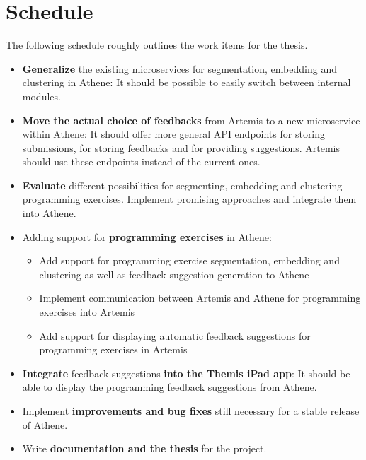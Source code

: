 \section*{Schedule}

The following schedule roughly outlines the work items for the thesis.

\begin{itemize}
    \item \textbf{Generalize} the existing microservices for segmentation, embedding and clustering in Athene: It should be possible to easily switch between internal modules.
    \item \textbf{Move the actual choice of feedbacks} from Artemis to a new microservice within Athene: It should offer more general API endpoints for storing submissions, for storing feedbacks and for providing suggestions. Artemis should use these endpoints instead of the current ones.
    \item \textbf{Evaluate} different possibilities for segmenting, embedding and clustering programming exercises. Implement promising approaches and integrate them into Athene. %
    \item Adding support for \textbf{programming exercises} in Athene:
    \begin{itemize}
        \item Add support for programming exercise segmentation, embedding and clustering as well as feedback suggestion generation to Athene
        \item Implement communication between Artemis and Athene for programming exercises into Artemis
        \item Add support for displaying automatic feedback suggestions for programming exercises in Artemis
    \end{itemize}
    \item \textbf{Integrate} feedback suggestions \textbf{into the Themis iPad app}: It should be able to display the programming feedback suggestions from Athene.
    \item Implement \textbf{improvements and bug fixes} still necessary for a stable release of Athene.
    \item Write \textbf{documentation and the thesis} for the project.
\end{itemize}


\clearpage

\clearpage




